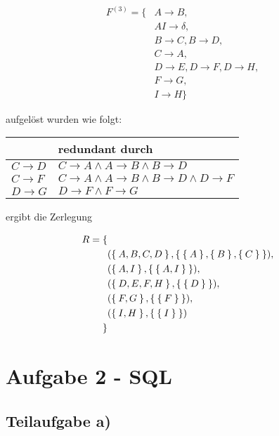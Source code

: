 \documentclass[a4paper,9pt]{scrartcl}
\begin{document}
\begin{align*}
F^{(3)} = \{  & A \rightarrow B,\\
    &AI \rightarrow \delta,\\
    & B \rightarrow C, B \rightarrow D,\\
    & C \rightarrow A,\\
    & D \rightarrow E,D \rightarrow F,D \rightarrow H,\\
    & F \rightarrow G,\\
    & I \rightarrow H
\}
\end{align*}

aufgelöst wurden wie folgt:

  \begin{tabular}{l|l}
             & redundant durch\\
    \hline
    $C \rightarrow D$ & $C \rightarrow A \land A \rightarrow B \land B \rightarrow D$\\
    $C \rightarrow F$ & $C \rightarrow A \land A \rightarrow B \land B \rightarrow D \land D \rightarrow F$\\
    $D \rightarrow G$ & $D \rightarrow F \land F \rightarrow G$\\
  \end{tabular}

ergibt die Zerlegung

\begin{align*}
    R = \{\\
            & (\Set{A, B, C, D}, \Set{\Set{A}, \Set{B}, \Set{C}}),\\
            &(\Set{A, I}, \Set{\Set{A, I}}),\\
            & (\Set{D, E, F, H},\Set{\Set{D}}),\\
            & (\Set{F, G}, \Set{\Set{F}}),\\
            & (\Set{I, H}, \Set{\Set{I}})\\
        \}
\end{align*}
\clearpage

\section{Aufgabe 2 - SQL}
\subsection{Teilaufgabe a)}
\end{document}
